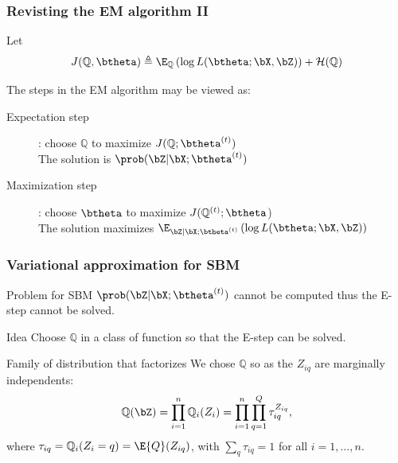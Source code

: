 \documentclass{beamer}\usepackage[]{graphicx}\usepackage[]{color}
\begin{document}
\begin{frame}
  \frametitle{Revisting the EM algorithm II}
  Let
   \begin{equation*}
    J(\mathbb{Q},\btheta) \triangleq \E_{\mathbb{Q}}\left(\log L(\btheta ;\bX,\bZ)\right) + \mathcal{H}(\mathbb{Q})
\end{equation*}

  \vfill

  The steps in the EM algorithm may be viewed as:
  \begin{description}
    \item[Expectation step]: choose $\mathbb{Q}$ to maximize $J(\mathbb{Q};\btheta^{(t)})$\\[2ex]
      \alert{The solution is $\prob(\bZ|\bX;\btheta^{(t)})$}\\
    \item[Maximization step]: choose $\btheta$ to maximize $J(\mathbb{Q}^{(t)};\btheta$)\\[2ex]
      \alert{The solution maximizes $\E_{\bZ|\bX;\btheta^{(t)}}\left(\log L(\btheta ;\bX,\bZ)\right)$}
  \end{description}

\end{frame}

\begin{frame}
  \frametitle{Variational approximation for SBM}

    \begin{block}{Problem for SBM}
      $\prob(\bZ|\bX;\btheta^{(t)})$ cannot be computed thus the E-step cannot be solved.
  \end{block}

  \begin{block}{Idea}
      Choose $\mathbb{Q}$ in a class of function so that the E-step can be solved.
  \end{block}

  \begin{block}{Family of distribution that factorizes}
      We chose $\mathbb{Q}$ so as the $Z_{iq}$ are marginally independents:
      \begin{equation*}
        \mathbb{Q}(\bZ) = \prod_{i=1}^n \mathbb{Q}_i(Z_i) = \prod_{i=1}^n\prod_{q=1}^Q \tau_{iq}^{Z_{iq}},
      \end{equation*}
      where $\tau_{iq} =\mathbb{Q}_i(Z_{i} = q) = \E{Q}(Z_{iq})$, with $\sum_{q} \tau_{iq} = 1$ for all $i=1,\dots,n$.
  \end{block}

\end{frame}
\end{document}
